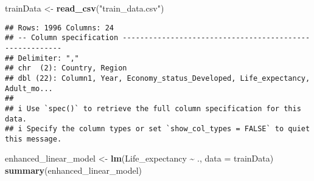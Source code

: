 \documentclass[
]{article}
\newenvironment{Shaded}{\begin{snugshade}}{\end{snugshade}}
\newcommand{\AttributeTok}[1]{\textcolor[rgb]{0.13,0.29,0.53}{#1}}
\newcommand{\FunctionTok}[1]{\textcolor[rgb]{0.13,0.29,0.53}{\textbf{#1}}}
\newcommand{\NormalTok}[1]{#1}
\newcommand{\OtherTok}[1]{\textcolor[rgb]{0.56,0.35,0.01}{#1}}
\newcommand{\SpecialCharTok}[1]{\textcolor[rgb]{0.81,0.36,0.00}{\textbf{#1}}}
\newcommand{\StringTok}[1]{\textcolor[rgb]{0.31,0.60,0.02}{#1}}
\begin{document}
\begin{Shaded}
\begin{Highlighting}[]
\NormalTok{trainData }\OtherTok{\textless{}{-}} \FunctionTok{read\_csv}\NormalTok{(}\StringTok{"train\_data.csv"}\NormalTok{)}
\end{Highlighting}
\end{Shaded}

\begin{verbatim}
## Rows: 1996 Columns: 24
## -- Column specification --------------------------------------------------------
## Delimiter: ","
## chr  (2): Country, Region
## dbl (22): Column1, Year, Economy_status_Developed, Life_expectancy, Adult_mo...
## 
## i Use `spec()` to retrieve the full column specification for this data.
## i Specify the column types or set `show_col_types = FALSE` to quiet this message.
\end{verbatim}

\begin{Shaded}
\begin{Highlighting}[]
\NormalTok{enhanced\_linear\_model }\OtherTok{\textless{}{-}} \FunctionTok{lm}\NormalTok{(Life\_expectancy }\SpecialCharTok{\textasciitilde{}}\NormalTok{ ., }\AttributeTok{data =}\NormalTok{ trainData)}
\FunctionTok{summary}\NormalTok{(enhanced\_linear\_model)}
\end{Highlighting}
\end{Shaded}
\end{document}
